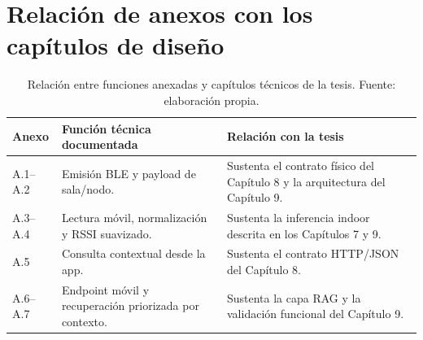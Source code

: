 \section{Relación de anexos con los capítulos de diseño}

\begin{table}[H]
    \centering
    \footnotesize
    \setlength{\tabcolsep}{4pt}
    \begin{tabular}{>{\raggedright\arraybackslash}p{4.1cm} >{\raggedright\arraybackslash}p{5.0cm} >{\raggedright\arraybackslash}p{5.0cm}}
        \hline
        \textbf{Anexo} & \textbf{Función técnica documentada} & \textbf{Relación con la tesis} \\
        \hline
        A.1--A.2 & Emisión BLE y payload de sala/nodo. & Sustenta el contrato físico del Capítulo 8 y la arquitectura del Capítulo 9. \\
        A.3--A.4 & Lectura móvil, normalización y RSSI suavizado. & Sustenta la inferencia indoor descrita en los Capítulos 7 y 9. \\
        A.5 & Consulta contextual desde la app. & Sustenta el contrato HTTP/JSON del Capítulo 8. \\
        A.6--A.7 & Endpoint móvil y recuperación priorizada por contexto. & Sustenta la capa RAG y la validación funcional del Capítulo 9. \\
        \hline
    \end{tabular}
    \caption[Relación entre anexos y capítulos técnicos]{Relación entre funciones anexadas y capítulos técnicos de la tesis. Fuente: elaboración propia.}
    \label{tab:relacion-anexos-capitulos}
\end{table}
